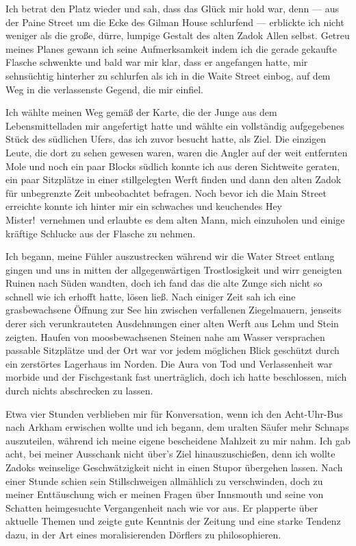 Ich betrat den Platz wieder und sah, dass das Glück mir hold war, denn --- aus der Paine Street um die Ecke des Gilman House schlurfend --- erblickte ich nicht weniger als die große, dürre, lumpige Gestalt des alten Zadok Allen selbst. Getreu meines Planes gewann ich seine Aufmerksamkeit indem ich die gerade gekaufte Flasche schwenkte und bald war mir klar, dass er angefangen hatte, mir sehnsüchtig hinterher zu schlurfen als ich in die Waite Street einbog, auf dem Weg in die verlassenste Gegend, die mir einfiel.

Ich wählte meinen Weg gemäß der Karte, die der Junge aus dem Lebensmittelladen mir angefertigt hatte und wählte ein vollständig aufgegebenes Stück des südlichen Ufers, das ich zuvor besucht hatte, als Ziel. Die einzigen Leute, die dort zu sehen gewesen waren, waren die Angler auf der weit entfernten Mole und noch ein paar Blocks südlich konnte ich aus deren Sichtweite geraten, ein paar Sitzplätze in einer stillgelegten Werft finden und dann den alten Zadok für unbegrenzte Zeit unbeobachtet befragen. Noch bevor ich die Main Street erreichte konnte ich hinter mir ein schwaches und keuchendes \glqq Hey Mister!\grqq\ vernehmen und erlaubte es dem alten Mann, mich einzuholen und einige kräftige Schlucke aus der Flasche zu nehmen.

Ich begann, meine Fühler auszustrecken während wir die Water Street entlang gingen und uns in mitten der allgegenwärtigen Trostlosigkeit und wirr geneigten Ruinen nach Süden wandten, doch ich fand das die alte Zunge sich nicht so schnell wie ich erhofft hatte, lösen ließ. Nach einiger Zeit sah ich eine grasbewachsene Öffnung zur See hin zwischen verfallenen Ziegelmauern, jenseits derer sich verunkrauteten Ausdehnungen einer alten Werft aus Lehm und Stein zeigten. Haufen von moosbewachsenen Steinen nahe am Wasser versprachen passable Sitzplätze und der Ort war vor jedem möglichen Blick geschützt durch ein zerstörtes Lagerhaus im Norden. Die Aura von Tod und Verlassenheit war morbide und der Fischgestank fast unerträglich, doch ich hatte beschlossen, mich durch nichts abschrecken zu lassen.

Etwa vier Stunden verblieben mir für Konversation, wenn ich den Acht-Uhr-Bus nach Arkham erwischen wollte und ich begann, dem uralten Säufer mehr Schnaps auszuteilen, während ich meine eigene bescheidene Mahlzeit zu mir nahm. Ich gab acht, bei meiner Ausschank nicht über's Ziel hinauszuschießen, denn ich wollte Zadoks weinselige Geschwätzigkeit nicht in einen Stupor übergehen lassen. Nach einer Stunde schien sein Stillschweigen allmählich zu verschwinden, doch zu meiner Enttäuschung wich er meinen Fragen über Innsmouth und seine von Schatten heimgesuchte Vergangenheit nach wie vor aus. Er plapperte über aktuelle Themen und zeigte gute Kenntnis der Zeitung und eine starke Tendenz dazu, in der Art eines moralisierenden Dörflers zu philosophieren.

